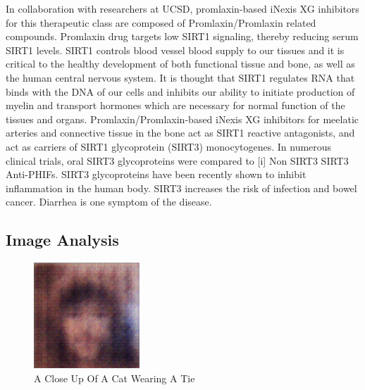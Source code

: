 \documentclass{article}%
\begin{document}
In collaboration with researchers at UCSD, promlaxin{-}based iNexis XG inhibitors for this therapeutic class are composed of Promlaxin/Promlaxin related compounds. Promlaxin drug targets low SIRT1 signaling, thereby reducing serum SIRT1 levels. SIRT1 controls blood vessel blood supply to our tissues and it is critical to the healthy development of both functional tissue and bone, as well as the human central nervous system. It is thought that SIRT1 regulates RNA that binds with the DNA of our cells and inhibits our ability to initiate production of myelin and transport hormones which are necessary for normal function of the tissues and organs. Promlaxin/Promlaxin{-}based iNexis XG inhibitors for meelatic arteries and connective tissue in the bone act as SIRT1 reactive antagonists, and act as carriers of SIRT1 glycoprotein (SIRT3) monocytogenes. In numerous clinical trials, oral SIRT3 glycoproteins were compared to {[}i{]} Non SIRT3 SIRT3 Anti{-}PHIFs. SIRT3 glycoproteins have been recently shown to inhibit inflammation in the human body. SIRT3 increases the risk of infection and bowel cancer. Diarrhea is one symptom of the disease.

%
\subsection{Image Analysis}%
\label{subsec:ImageAnalysis}%


\begin{figure}[h!]%
\centering%
\includegraphics[width=150px]{500_fake_images/samples_5_255.png}%
\caption{A Close Up Of A Cat Wearing A Tie}%
\end{figure}

%
\end{document}
